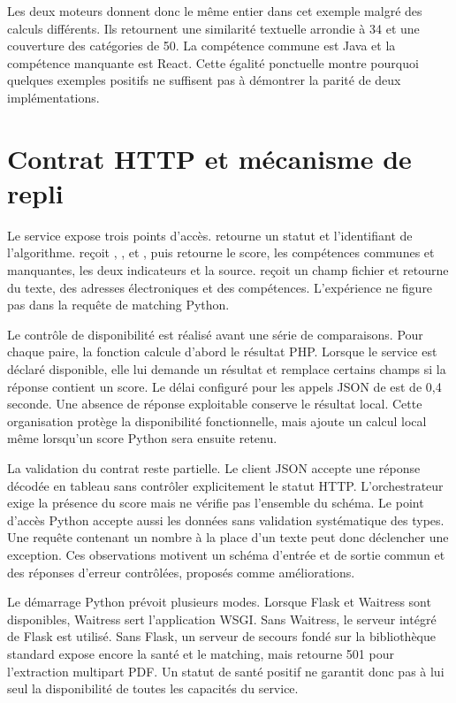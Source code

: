 Les deux moteurs donnent donc le même entier dans cet exemple malgré des calculs différents. Ils retournent une similarité textuelle arrondie à 34 et une couverture des catégories de 50. La compétence commune est Java et la compétence manquante est React. Cette égalité ponctuelle montre pourquoi quelques exemples positifs ne suffisent pas à démontrer la parité de deux implémentations.

\section{Contrat HTTP et mécanisme de repli}

Le service expose trois points d'accès.  retourne un statut et l'identifiant de l'algorithme.  reçoit , ,  et , puis retourne le score, les compétences communes et manquantes, les deux indicateurs et la source.  reçoit un champ fichier et retourne du texte, des adresses électroniques et des compétences. L'expérience ne figure pas dans la requête de matching Python.

Le contrôle de disponibilité est réalisé avant une série de comparaisons. Pour chaque paire, la fonction  calcule d'abord le résultat PHP. Lorsque le service est déclaré disponible, elle lui demande un résultat et remplace certains champs si la réponse contient un score. Le délai configuré pour les appels JSON de  est de 0,4 seconde. Une absence de réponse exploitable conserve le résultat local. Cette organisation protège la disponibilité fonctionnelle, mais ajoute un calcul local même lorsqu'un score Python sera ensuite retenu.

La validation du contrat reste partielle. Le client JSON accepte une réponse décodée en tableau sans contrôler explicitement le statut HTTP. L'orchestrateur exige la présence du score mais ne vérifie pas l'ensemble du schéma. Le point d'accès Python accepte aussi les données sans validation systématique des types. Une requête contenant un nombre à la place d'un texte peut donc déclencher une exception. Ces observations motivent un schéma d'entrée et de sortie commun et des réponses d'erreur contrôlées, proposés comme améliorations.

Le démarrage Python prévoit plusieurs modes. Lorsque Flask et Waitress sont disponibles, Waitress sert l'application WSGI. Sans Waitress, le serveur intégré de Flask est utilisé. Sans Flask, un serveur de secours fondé sur la bibliothèque standard expose encore la santé et le matching, mais retourne 501 pour l'extraction multipart PDF. Un statut de santé positif ne garantit donc pas à lui seul la disponibilité de toutes les capacités du service.

